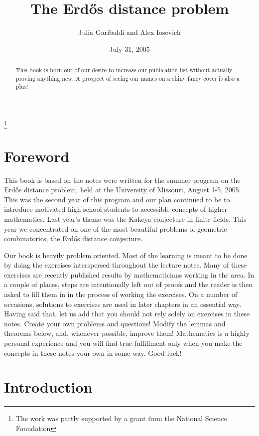 \documentclass[]{amsart}
\numberwithin{equation}{section}
\theoremstyle{plain}
\theoremstyle{definition}
\theoremstyle{remark}
\begin{document}
\title{The Erd\H{o}s
distance problem}
\author{Julia
Garibaldi and Alex
Iosevich}

\date{July 31, 2005}

\address{Department of Mathematics, University of Missouri-Columbia,
Columbia Missouri 65211 USA}
\thanks{The work was
partly supported by a
grant from the National Science Foundation}
\maketitle
\begin{abstract} This book is born out of our desire to increase our publication list without actually proving anything new. A prospect of seeing our names on a shiny fancy cover is also a plus!
\end{abstract}

\section*{Foreword}

This book is based on the notes were written for the summer program on the Erd\H{o}s
distance problem, held at the University of Missouri, August
1-5, 2005. This was the second year of this program and our plan
continued to be to introduce motivated high school students to
accessible concepts of higher mathematics. Last year's theme was
the Kakeya conjecture in finite fields. This year we concentrated
on one of the most beautiful problems of geometric combinatorics,
the Erd\H{o}s distance conjecture.

Our book is heavily problem oriented. Most of the learning is
meant to be done by doing the exercises interspersed throughout
the lecture notes. Many of these exercises are recently published
results by mathematicians working in the area. In a couple of
places, steps are intentionally left out of proofs and the reader
is then asked to fill them in in the process of working the
exercises. On a number of occasions, solutions to exercises
are used in later chapters in an essential way. Having said that,
let us add that you should not rely solely on exercises in these
notes. Create your own problems and questions! Modify the
lemmas and theorems below, and, whenever possible,
improve them! Mathematics is a highly personal experience and
you will find true fulfillment only when you make the concepts
in these notes your own in some way. Good luck!

\section*{Introduction}
\end{document}
